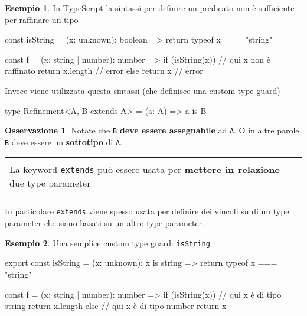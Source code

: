 \documentclass[12pt]{article}
\theoremstyle{definition}
\newtheorem{example}{Esempio}[subsection]
\newtheorem{observation}{Osservazione}[subsection]
\newenvironment{boxed}
    {\begin{center}
    \begin{tabular}{|p{0.9\textwidth}|}
    \hline\\
    }
    {
    \\\\\hline
    \end{tabular}
    \end{center}
    }
\newenvironment{code}
  {\vspace{0.5cm} \VerbatimEnvironment\begin{typescriptcode}}
  {\end{typescriptcode} \vspace{0.2cm}}
\begin{document}
\begin{example}
In TypeScript la sintassi per definire un predicato non è sufficiente per raffinare un tipo

\begin{code}
const isString = (x: unknown): boolean => {
  return typeof x === "string"
}

const f = (x: string | number): number => {
  if (isString(x)) {
    // qui x non è raffinato
    return x.length // error
  } else {
    return x // error
  }
}
\end{code}
\end{example}

Invece viene utilizzata questa sintassi (che definisce una custom type guard)

\begin{code}
type Refinement<A, B extends A> = (a: A) => a is B
\end{code}

\begin{observation}
Notate che \texttt{B} \textbf{deve essere assegnabile} ad \texttt{A}.
O in altre parole \texttt{B} deve essere un \textbf{sottotipo} di \texttt{A}.
\end{observation}

\begin{boxed}
La keyword \texttt{extends} può essere usata per \textbf{mettere in relazione} due type parameter
\end{boxed}

In particolare \texttt{extends} viene spesso usata per definire dei vincoli su di un type parameter
che siano basati su un altro type parameter.

\begin{example}
Una semplice custom type guard: \texttt{isString}

\begin{code}
export const isString = (x: unknown): x is string => {
  return typeof x === "string"
}

const f = (x: string | number): number => {
  if (isString(x)) {
    // qui x è di tipo string
    return x.length
  } else {
    // qui x è di tipo number
    return x
  }
}
\end{code}
\end{example}
\end{document}
